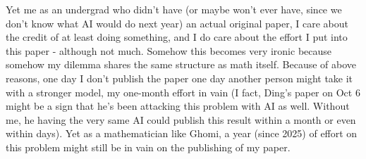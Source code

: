 \documentclass[11pt]{amsart}
\theoremstyle{definition}
\theoremstyle{remark}
\numberwithin{equation}{section}
\begin{document}
Yet me as an undergrad who didn't have (or maybe won't ever have, since we don't know what AI would do next year) an actual original paper, I care about the credit of at least doing something, and I do care about the effort I put into this paper - although not much. Somehow this becomes very ironic because somehow my dilemma shares the same structure as math itself. Because of above reasons, one day I don't publish the paper one day another person might take it with a stronger model, my one-month effort in vain (I fact, Ding's paper on Oct 6 might be a sign that he's been attacking this problem with AI as well. Without me, he having the very same AI could publish this result within a month or even within days). Yet as a mathematician like Ghomi, a year (since 2025) of effort on this problem might still be in vain on the publishing of my paper.
\end{document}

